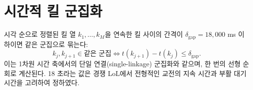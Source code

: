 
\section{시간적 킬 군집화}
\label{sec:loc-temporal}

시각 순으로 정렬된 킬 열 $k_1, \dots, k_M$을 연속한 킬 사이의 간격이 $\delta_{\mathrm{gap}} = 18{,}000$ ms 이하이면 같은 군집으로 묶는다:
\begin{equation}
  k_j, k_{j+1} \in \text{같은 군집} \iff t(k_{j+1}) - t(k_j) \le \delta_{\mathrm{gap}}.
\end{equation}
이는 1차원 시간 축에서의 단일 연결(single-linkage) 군집화와 같으며, 한 번의 선형 순회로 계산된다. 18 초라는 값은 경쟁 LoL에서 전형적인 교전의 지속 시간과 부활 대기시간을 고려하여 정하였다.
